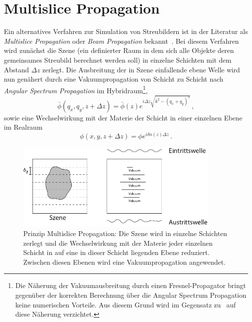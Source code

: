 \section{Multislice Propagation}
Ein alternatives Verfahren zur Simulation von Streubildern ist in der Literatur als \textit{Multislice Propagation} oder \textit{Beam Propagation} bekannt~\cite{hare1994,cowley1957}. Bei diesem Verfahren wird zunächst die Szene (ein definierter Raum in dem sich alle Objekte deren gemeinsames Streubild berechnet werden soll) in einzelne Schichten mit dem Abstand $\Delta z$ zerlegt. Die Ausbreitung der in Szene einfallende ebene Welle wird nun genähert durch eine Vakuumpropagation von Schicht zu Schicht nach \textit{Angular Spectrum Propagation} im Hybridraum\footnote{Die Näherung der Vakuumausbreitung durch einen Fresnel-Propagator bringt gegenüber der korrekten Berechnung über die Angular Spectrum Propagation keine numerischen Vorteile. Aus diesem Grund wird im Gegensatz zu~\cite{hare1994} auf diese Näherung verzichtet.},
\begin{equation}
	\bar{\phi}\left(q_x,q_y,z+\Delta z\right)=\bar{\phi}(z)e^{i\Delta z\sqrt{k^2-(q_x+q_y)^2}} \, ,
\end{equation}
sowie eine Wechselwirkung mit der Materie der Schicht in einer einzelnen Ebene im Realraum
\begin{equation}
	\phi(x,y,z+\Delta z)=\phi e^{i\delta n\left(z\right) \Delta z} \, .
\end{equation}
\begin{figure}
	\centering
	\includegraphics[width=0.9\textwidth]{images/multislice.pdf}
	\caption[Prinzip Multislice Propagation]{Prinzip Multislice Propagation: Die Szene wird in einzelne Schichten zerlegt und die Wechselwirkung mit der Materie jeder einzelnen Schicht in auf eine in dieser Schicht liegenden Ebene reduziert. Zwischen diesen Ebenen wird eine Vakuumpropagation angewendet.}
	\label{fig:multislice}
\end{figure} 	

